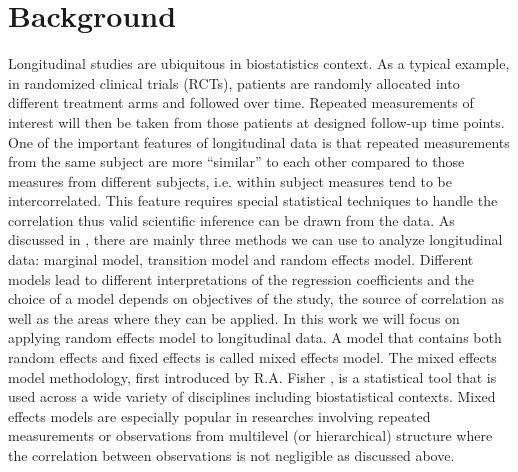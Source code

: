 





% 


\section{Background}
Longitudinal studies are ubiquitous in biostatistics context. As a typical example, in randomized clinical trials (RCTs), patients are randomly allocated into different treatment arms and followed over time. Repeated measurements of interest will then be taken from those patients at designed follow-up time points. One of the important features of longitudinal data is that repeated measurements from the same subject are more ``similar'' to each other compared to those measures from different subjects, i.e. within subject measures tend to be intercorrelated. This feature requires special statistical techniques to handle the correlation thus valid scientific inference can be drawn from the data. As discussed in \citep{diggle2002analysis}, there are mainly three methods we can use to analyze longitudinal data: marginal model, transition model and random effects model. Different models lead to different interpretations of the regression coefficients and the choice of a model depends on objectives of the study, the source of correlation as well as the areas where they can be applied. In this work we will focus on applying random effects model to longitudinal data. A model that contains both random effects and fixed effects is called mixed effects model. The mixed effects model methodology, first introduced by R.A. Fisher \citep{fisher1919xv},  is a statistical tool that is used across a wide variety of disciplines including biostatistical contexts. Mixed effects models are especially popular in researches involving repeated measurements or observations from multilevel (or hierarchical) structure where the correlation between observations is not negligible as discussed above.\par

